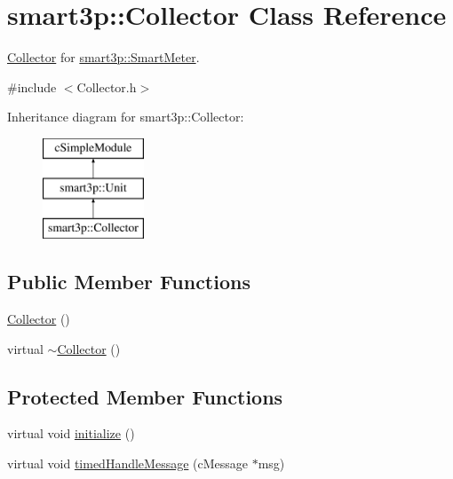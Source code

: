 \hypertarget{classsmart3p_1_1Collector}{}\section{smart3p\+:\+:Collector Class Reference}
\label{classsmart3p_1_1Collector}


\hyperlink{classsmart3p_1_1Collector}{Collector} for \hyperlink{classsmart3p_1_1SmartMeter}{smart3p\+::\+Smart\+Meter}.  




{\ttfamily \#include $<$Collector.\+h$>$}

Inheritance diagram for smart3p\+:\+:Collector\+:\begin{figure}[H]
\begin{center}
\leavevmode
\includegraphics[height=3.000000cm]{classsmart3p_1_1Collector}
\end{center}
\end{figure}
\subsection*{Public Member Functions}
\begin{DoxyCompactItemize}
\item 
\hyperlink{classsmart3p_1_1Collector_afb4275cafc381a2650b7a6dd9465662e}{Collector} ()
\item 
virtual \hyperlink{classsmart3p_1_1Collector_a650466fb964d056afb0f35b1d6966e7c}{$\sim$\+Collector} ()
\end{DoxyCompactItemize}
\subsection*{Protected Member Functions}
\begin{DoxyCompactItemize}
\item 
virtual void \hyperlink{classsmart3p_1_1Collector_acc6c1b2f235b3c4acb7ca84f7c356e80}{initialize} ()
\item 
virtual void \hyperlink{classsmart3p_1_1Collector_a1b82f1a10a2579c3ed25bc899220b906}{timed\+Handle\+Message} (c\+Message $\ast$msg)
\end{DoxyCompactItemize}
